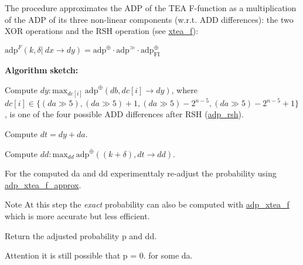 \-The procedure approximates the \-A\-D\-P of the \-T\-E\-A \-F-\/function as a multiplication of the \-A\-D\-P of its three non-\/linear components (w.\-r.\-t. \-A\-D\-D differences)\-: the two \-X\-O\-R operations and the \-R\-S\-H operation (see \hyperlink{xtea_8hh_a6c0b7a7bc47458fb343e66188fe4abda}{xtea\-\_\-f})\-:

$\mathrm{adp}^{F}(k, \delta |~ dx \rightarrow dy) = \mathrm{adp}^{\oplus} \cdot \mathrm{adp}^{\gg} \cdot \mathrm{adp}^{\oplus}_{\mathrm{FI}}$

{\bfseries \-Algorithm} {\bfseries sketch\-:} 


\begin{DoxyEnumerate}
\item \-Compute $ dy: \mathrm{max}_{dc[i]}~\mathrm{adp}^{\oplus}(db, dc[i] \rightarrow dy) $, where $dc[i] \in \{(da \gg 5), (da \gg 5) + 1, (da \gg 5) - 2^{n-5}, (da \gg 5) - 2^{n-5} + 1\}$, is one of the four possible \-A\-D\-D differences after \-R\-S\-H (\hyperlink{adp-shift_8hh_a06fffd781af6662482922889bc562caf}{adp\-\_\-rsh}).
\item \-Compute $dt = dy + da$.
\item \-Compute $ dd:\mathrm{max}_{dd}~\mathrm{adp}^{\oplus}((k + \delta), dt \rightarrow dd)$.
\item \-For the computed {\ttfamily da} and {\ttfamily dd} experimenttaly re-\/adjust the probability using \hyperlink{adp-xtea-f-fk_8hh_a07bf299450a988931eb46ec5cca05150}{adp\-\_\-xtea\-\_\-f\-\_\-approx}. \begin{DoxyNote}{\-Note}
\-At this step the {\itshape exact\/} probability can also be computed with \hyperlink{adp-xtea-f-fk_8hh_af678f1852341d1a0f4111299fd24f5d8}{adp\-\_\-xtea\-\_\-f} which is more accurate but less efficient.
\end{DoxyNote}

\item \-Return the adjusted probability {\ttfamily p} and {\ttfamily dd}.
\end{DoxyEnumerate}

\begin{DoxyAttention}{\-Attention}
it is still possible that p = 0. for some {\ttfamily da}.
\end{DoxyAttention}

